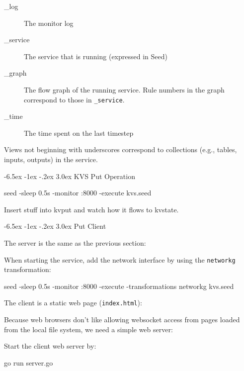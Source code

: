 \documentclass[a5paper,12pt,onecolumn]{article}
\makeatletter
\def\code#1{\mbox{\lstinline{#1}}}
\renewcommand\section{\@startsection {section}{1}{\z@}%
	{-6.5ex \@plus -1ex \@minus -.2ex}%
	{3.0ex}%
	{\sf\Large}}
\makeatother
\begin{document}
\begin{description}
\item[\_log] The monitor log
\item[\_service] The service that is running (expressed in Seed)
\item[\_graph] The flow graph of the running service. Rule numbers in the graph correspond to those in \code{_service}.
\item[\_time] The time spent on the last timestep
\end{description}

Views not beginning with underscores correspond to collections (e.g., tables, inputs, outputs) in the service.

\section{KVS Put Operation}



\begin{cli}
seed -sleep 0.5s -monitor :8000 -execute kvs.seed
\end{cli}

Insert stuff into kvput and watch how it flows to kvstate.

\section{Put Client}

The server is the same as the previous section:



When starting the service, add the network interface by using the \code{networkg} transformation:

\begin{cli}
seed -sleep 0.5s -monitor :8000 -execute -transformations networkg kvs.seed
\end{cli}

The client is a static web page (\code{index.html}):



Because web browsers don't like allowing websocket access from pages loaded from the local file system, we need a simple web server:



Start the client web server by:

\begin{cli}
go run server.go
\end{cli}
\end{document}
